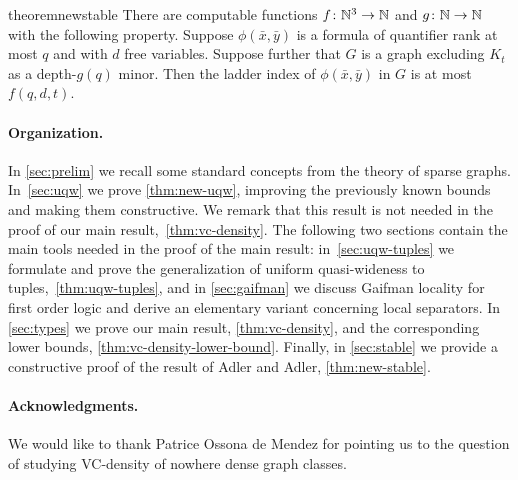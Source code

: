 \begin{restatable}{theorem}{newstable}\label{thm:new-stable}
There are computable functions $f\colon \mathbb{N}^3\to\mathbb{N}$ and $g\colon\mathbb{N}\to\mathbb{N}$ with the following property.
Suppose $\phi(\bar x,\bar y)$ is a formula of quantifier rank at most $q$ and with $d$ free variables.
Suppose further that $G$ is a graph excluding $K_t$ as a depth-$g(q)$ minor. Then the ladder index of $\phi(\bar x,\bar y)$ in $G$ is at most $f(q,d,t)$.
\end{restatable}


\paragraph{Organization.} In \cref{sec:prelim} we recall some standard concepts from the theory of sparse graphs.
In~\cref{sec:uqw} we  prove \cref{thm:new-uqw}, improving the previously known bounds and making them constructive. We remark that this result is not needed in the proof of our main result,~\cref{thm:vc-density}. The following two sections
 contain the main tools needed in the proof of the main result:
in~\cref{sec:uqw-tuples} we formulate and prove the generalization of uniform quasi-wideness to tuples,~\cref{thm:uqw-tuples}, and 
in \cref{sec:gaifman} we discuss Gaifman locality for first order logic and derive an elementary variant concerning local separators. 
In \cref{sec:types} we prove our main result, \cref{thm:vc-density}, and the corresponding lower bounds, \cref{thm:vc-density-lower-bound}.
Finally, in \cref{sec:stable} we provide a constructive proof of the result of Adler and Adler, \cref{thm:new-stable}.

\paragraph{Acknowledgments.} We would like to
thank Patrice Ossona de Mendez for pointing us to the
question of studying VC-density of nowhere dense graph
classes.
\pagebreak
